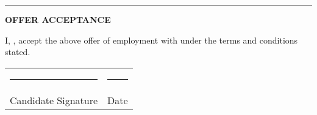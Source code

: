 \documentclass[a4paper,8pt]{article}
\begin{document}
\vspace{0.4cm}

\hrule
\vspace{0.4cm}

\textbf{OFFER ACCEPTANCE}

I, , accept the above offer of employment with  under the terms and conditions stated.

\vspace{1.2cm}

\begin{tabular}{ll}
\rule{6cm}{0.5pt} & \rule{3cm}{0.5pt} \\
Candidate Signature & Date \\
\end{tabular}
\end{document}
